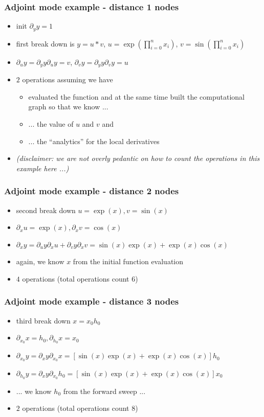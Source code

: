 \documentclass[10pt,German]{beamer}
\begin{document}
\begin{frame}[fragile]
\frametitle{Adjoint mode example - distance 1 nodes}
\begin{itemize}
\item init $\partial_y y = 1$
\item first break down is $y = u*v$, $u=\exp\left( \prod_{i=0}^n x_i \right)$, $v=\sin\left( \prod_{i=0}^n x_i \right)$
\item $\partial_u y = \partial_y y \partial _u y = v$, $\partial_v y = \partial_y y \partial _v y = u$
\item $2$ operations assuming we have
\begin{itemize}
\item evaluated the function and at the same time built the computational graph so that we know ...
\item ... the value of $u$ and $v$ and
\item ... the ``analytics'' for the local derivatives
\end{itemize}
\item \textit{(disclaimer: we are not overly pedantic on how to count the operations in this example here ...)}
\end{itemize}
\end{frame}

\begin{frame}[fragile]
\frametitle{Adjoint mode example - distance 2 nodes}
\begin{itemize}
\item second break down $u = \exp(x), v= \sin(x)$
\item $\partial_x u = \exp(x), \partial_x v = \cos(x)$
\item $\partial_x y = \partial_u y \partial_x u + \partial_v y \partial_x v = \sin(x)\exp(x)+\exp(x)\cos(x)$
\item again, we know $x$ from the initial function evaluation
\item $4$ operations (total operations count $6$)
\end{itemize}
\end{frame}

\begin{frame}[fragile]
\frametitle{Adjoint mode example - distance 3 nodes}
\begin{itemize}
\item third break down $x = x_0 h_0$
\item $\partial_{x_0} x = h_0, \partial_{h_0} x = x_0$
\item $\partial_{x_0} y = \partial_x y \partial_{x_0} x = [\sin(x)\exp(x)+\exp(x)\cos(x)] h_0$
\item $\partial_{h_0} y = \partial_x y \partial_{x_0} h_0 = [\sin(x)\exp(x)+\exp(x)\cos(x)] x_0$
\item ... we know $h_0$ from the forward sweep ...
\item $2$ operations (total operations count $8$)
\end{itemize}
\end{frame}
\end{document}
